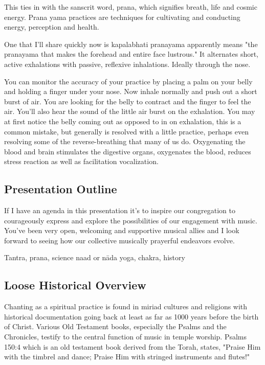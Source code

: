 \documentclass[12pt]{article}
\begin{document}
This ties in with the sanscrit word, prana, which signifies breath, life and cosmic energy. Prana yama practices are techniques for cultivating and conducting energy, perception and health.

One that I'll share quickly now is kapalabhati pranayama apparently means "the pranayama that makes the forehead and entire face lustrous." It alternates short, active exhalations with passive, reflexive inhalations. Ideally through the nose.

You can monitor the accuracy of your practice by placing a palm on your belly and holding a finger under your nose. Now inhale normally and push out a short burst of air. You are looking for the belly to contract and the finger to feel the air. You'll also hear the sound of the little air burst on the exhalation. You may at first notice the belly coming out as opposed to in on exhalation, this is a common mistake, but generally is resolved with a little practice, perhaps even resolving some of the reverse-breathing that many of us do. Oxygenating the blood and brain stimulates the digestive organs, oxygenates the blood, reduces stress reaction as well as facilitation vocalization.

\subsection*{Presentation Outline}

If I have an agenda in this presentation it's to inspire our congregation to courageously express and explore the possibilities of our engagement with music. You've been very open, welcoming and supportive musical allies and I look forward to seeing how our collective musically prayerful endeavors evolve.

Tantra, prana, science naad or nāda yoga, chakra, history

\subsection*{Loose Historical Overview}

Chanting as a spiritual practice is found in miriad cultures and religions with historical documentation going back at least as far as 1000 years before the birth of Christ. Various Old Testament books, especially the Psalms and the Chronicles, testify to the central function of music in temple worship. Psalms 150:4 which is an old testament book derived from the Torah, states, "Praise Him with the timbrel and dance; Praise Him with stringed instruments and flutes!"
\end{document}
